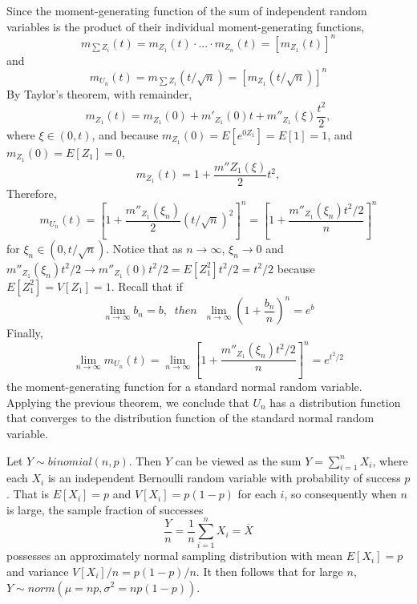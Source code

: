 \documentclass[12pt, a4paper, twoside, openright, titlepage]{book}
\begin{document}
\begin{proof*}{}{}
    Since the moment-generating function of the sum of independent random variables is the product of their individual moment-generating functions, \begin{equation*}
        m_{\sum Z_i}(t) = m_{Z_1}(t)\cdot ... \cdot m_{Z_n}(t) = [m_{Z_1}(t)]^n
    \end{equation*}
    and \begin{equation*}
        m_{U_n}(t) = m_{\sum Z_i}(t/\sqrt{n}) = \left[m_{Z_1}(t/\sqrt{n})\right]^n
    \end{equation*}
    By Taylor's theorem, with remainder, \begin{equation*}
        m_{Z_1}(t) = m_{Z_1}(0) + m'_{Z_1}(0)t + m''_{Z_1}(\xi)\frac{t^2}{2},
    \end{equation*}
    where $\xi \in (0,t)$, and because $m_{Z_1}(0) = E[e^{0Z_1}] = E[1] = 1$, and $m_{Z_1}(0) = E[Z_1] = 0$, \begin{equation*}
        m_{Z_1}(t) = 1 + \frac{m''{Z_1}(\xi)}{2}t^2,
    \end{equation*}
    Therefore, \begin{equation*}
        m_{U_n}(t) = \left[1+\frac{m''_{Z_1}(\xi_n)}{2}(t/\sqrt{n})^2\right]^n = \left[1+\frac{m''_{Z_1}(\xi_n)t^2/2}{n}\right]^n
    \end{equation*}
    for $\xi_n \in (0,t/\sqrt{n})$. Notice that as $n \rightarrow \infty$, $\xi_n \rightarrow 0$ and $m''_{Z_1}(\xi_n)t^2/2 \rightarrow m''_{Z_1}(0)t^2/2 = E[Z_1^2]t^2/2 = t^2/2$ because $E[Z_1^2] = V[Z_1] = 1$. Recall that if \begin{equation*}
        \lim\limits_{n\rightarrow \infty}b_n = b,\;\;then\;\;\lim\limits_{n\rightarrow \infty}\left(1 + \frac{b_n}{n}\right)^n = e^b
    \end{equation*}
    Finally, \begin{equation*}
        \lim\limits_{n\rightarrow \infty}m_{U_n}(t) = \lim\limits_{n\rightarrow \infty}\left[1+\frac{m''_{Z_1}(\xi_n)t^2/2}{n}\right]^n = e^{t^2/2}
    \end{equation*}
    the moment-generating function for a standard normal random variable. Applying the previous theorem, we conclude that $U_n$ has a distribution function that converges to the distribution function of the standard normal random variable.
\end{proof*}

Let $Y\sim binomial(n,p)$. Then $Y$ can be viewed as the sum $Y = \sum\limits_{i=1}^nX_i$, where each $X_i$ is an independent Bernoulli random variable with probability of success $p$. That is $E[X_i] = p$ and $V[X_i] = p(1-p)$ for each $i$, so consequently when $n$ is large, the sample fraction of successes \begin{equation*}
    \frac{Y}{n} = \frac{1}{n}\sum\limits_{i=1}^nX_i = \overline{X}
\end{equation*}
possesses an approximately normal sampling distribution with mean $E[X_i] = p$ and variance $V[X_i]/n = p(1-p)/n$. It then follows that for large $n$, $Y \sim norm(\mu= np, \sigma^2 = np(1-p))$.
\end{document}
